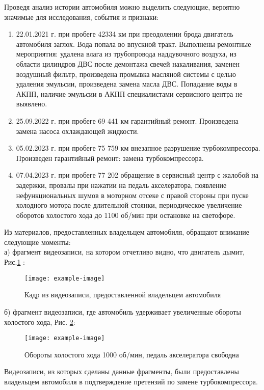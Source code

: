 \noindent Проведя анализ истории автомобиля  можно выделить следующие, вероятно  значимые для исследования, события и признаки:
\begin{enumerate}
\item  
22.01.2021 г. при пробеге 42334 км  при преодолении брода двигатель автомобиля заглох. Вода попала во впускной тракт. Выполнены ремонтные мероприятия: удалена влага из трубопровода наддувочного воздуха, из области цилиндров ДВС после демонтажа свечей накаливания, заменен воздушный фильтр, произведена промывка масляной системы с целью удаления эмульсии, произведена замена масла ДВС. Попадание воды в АКПП, наличие эмульсии в АКПП специалистами сервисного центра не выявлено.
\item 
25.09.2022 г. при пробеге 69 441 км гарантийный ремонт.  Произведена замена насоса охлаждающей жидкости.
\item 
05.02.2023 г. при пробеге 75 759 км внезапное разрушение турбокомпрессора. Произведен гарантийный ремонт: замена турбокомпрессора.
\item 
07.04.2023 г. при пробеге 77 202 обращение в сервисный центр с жалобой на задержки, провалы при нажатии на педаль акселератора, появление нефункциональных шумов в моторном отсеке с правой стороны при пуске холодного мотора после длительной стоянки, периодическое увеличение оборотов холостого хода до 1100 об/мин при остановке на светофоре.
\end{enumerate}
\vspace{5mm}
Из материалов, предоставленных владельцем автомобиля, обращают внимание следующие моменты:\\
а) фрагмент видеозаписи, на котором отчетливо видно, что двигатель дымит, Рис.\ref{dimit} :\\

\begin{figure}[H]
	\centering
	\texttt{[image: example-image]}
	\caption{Кадр из видеозаписи, предоставленной владельцем автомобиля}
	\label{dimit}
\end{figure}
б) фрагмент видеозаписи, где автомобиль удерживает увеличенные обороты  холостого хода, Рис. \ref{fig:1000}:

\begin{figure}[H]
	\centering
	\texttt{[image: example-image]}
	\caption{Обороты холостого хода 1000 об/мин, педаль акселератора свободна}
	\label{fig:1000}
\end{figure}

Видеозаписи, из которых  сделаны данные фрагменты, были предоставлены владельцем автомобиля в подтверждение претензий по замене турбокомпрессора.


